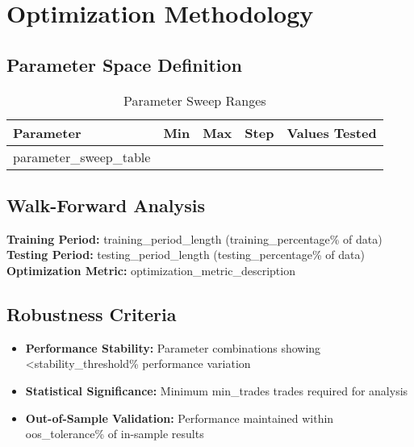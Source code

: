 \documentclass[11pt,a4paper]{article}
\begin{document}
\section{Optimization Methodology}

\subsection{Parameter Space Definition}
\begin{table}[H]
\centering
\caption{Parameter Sweep Ranges}
\begin{tabular}{lllll}
\toprule
\textbf{Parameter} & \textbf{Min} & \textbf{Max} & \textbf{Step} & \textbf{Values Tested} \\
\midrule
{{parameter_sweep_table}}
\bottomrule
\end{tabular}
\end{table}

\subsection{Walk-Forward Analysis}
\textbf{Training Period:} {{training_period_length}} ({{training_percentage}}\% of data) \\
\textbf{Testing Period:} {{testing_period_length}} ({{testing_percentage}}\% of data) \\
\textbf{Optimization Metric:} {{optimization_metric_description}}

\subsection{Robustness Criteria}
\begin{itemize}
\item \textbf{Performance Stability:} Parameter combinations showing <{{stability_threshold}}\% performance variation
\item \textbf{Statistical Significance:} Minimum {{min_trades}} trades required for analysis
\item \textbf{Out-of-Sample Validation:} Performance maintained within {{oos_tolerance}}\% of in-sample results
\end{itemize}

\end{document}
